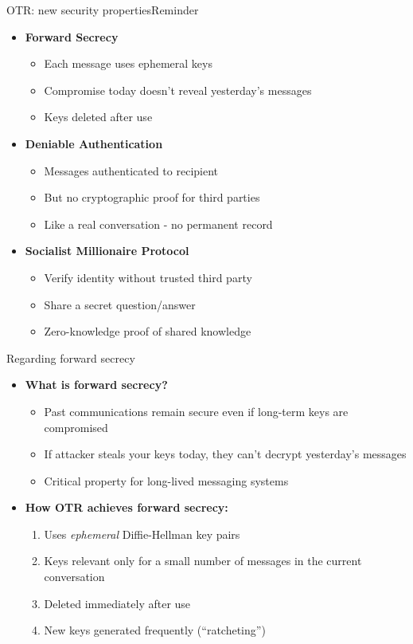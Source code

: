 \documentclass[aspectratio=169, lualatex, handout]{beamer}
\begin{document}
\begin{frame}{OTR: new security properties}{Reminder}
	\begin{itemize}
		\item \textbf{Forward Secrecy}
		      \begin{itemize}
			      \item Each message uses ephemeral keys
			      \item Compromise today doesn't reveal yesterday's messages
			      \item Keys deleted after use
		      \end{itemize}
		\item \textbf{Deniable Authentication}
		      \begin{itemize}
			      \item Messages authenticated to recipient
			      \item But no cryptographic proof for third parties
			      \item Like a real conversation - no permanent record
		      \end{itemize}
		\item \textbf{Socialist Millionaire Protocol}
		      \begin{itemize}
			      \item Verify identity without trusted third party
			      \item Share a secret question/answer
			      \item Zero-knowledge proof of shared knowledge
		      \end{itemize}
	\end{itemize}
\end{frame}

\begin{frame}{Regarding forward secrecy}
	\begin{itemize}
		\item \textbf{What is forward secrecy?}
		      \begin{itemize}
			      \item Past communications remain secure even if long-term keys are compromised
			      \item If attacker steals your keys today, they can't decrypt yesterday's messages
			      \item Critical property for long-lived messaging systems
		      \end{itemize}
		\item \textbf{How OTR achieves forward secrecy:}
		      \begin{enumerate}
			      \item Uses \textit{ephemeral} Diffie-Hellman key pairs
			      \item Keys relevant only for a small number of messages in the current conversation
			      \item Deleted immediately after use
			      \item New keys generated frequently (``ratcheting'')
		      \end{enumerate}
	\end{itemize}
\end{frame}
\end{document}
